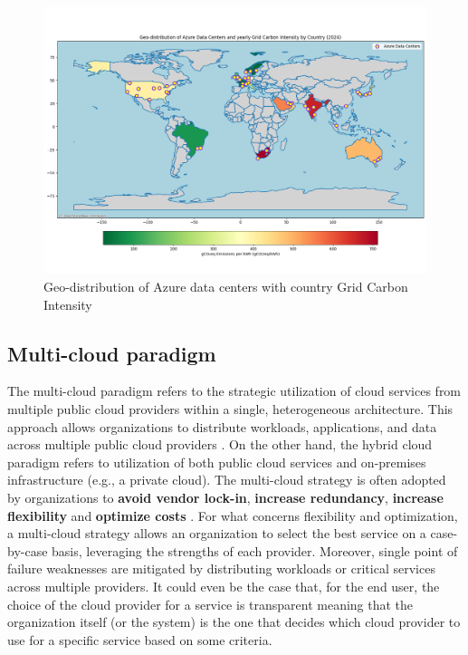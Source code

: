 \begin{figure}[t]
    \centering
    \includegraphics[width=1\linewidth]{images/azure_data_centers.png}
    \caption{Geo-distribution of Azure data centers with country Grid Carbon Intensity}
    \label{fig:azure_data_centers}
\end{figure}

\subsection{Multi-cloud paradigm}

The multi-cloud paradigm refers to the strategic utilization of cloud services from multiple public cloud providers within a single, heterogeneous architecture. 
This approach allows organizations to distribute workloads, applications, and data across multiple public cloud providers \cite{google_multicloud}.
On the other hand, the hybrid cloud paradigm refers to utilization of both public cloud services and on-premises infrastructure (e.g., a private cloud).
The multi-cloud strategy is often adopted by organizations to \textbf{avoid vendor lock-in}, \textbf{increase redundancy}, \textbf{increase flexibility} and \textbf{optimize costs} \cite{google_multicloud}.
For what concerns flexibility and optimization, a multi-cloud strategy allows an organization to select the best service on a case-by-case basis, leveraging the strengths of each provider.
Moreover, single point of failure weaknesses are mitigated by distributing workloads or critical services across multiple providers.
It could even be the case that, for the end user, the choice of the cloud provider for a service is transparent meaning that the organization itself (or the system) is the one that decides which cloud provider to use for a specific service based on some criteria.

